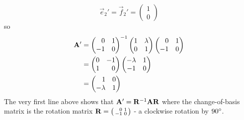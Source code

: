 \documentclass[fleqn,a4paper,11pt]{article}
\begin{document}
\begin{enumerate}[label=\textbf{\arabic*.}]
\begin{enumerate}[label=(\alph*)]
\begin{equation*}
     \vec e_2' = \vec f_2' = \begin{pmatrix} 1 \\ 0 \end{pmatrix}
    \end{equation*}
    so
    \begin{align*}
     \mat A'
     &=
     \begin{pmatrix*}[r]
      0 & 1 \\
      -1 & 0
     \end{pmatrix*}^{-1}
     \begin{pmatrix}
      1 & \lambda \\
      0 & 1
     \end{pmatrix}
     \begin{pmatrix*}[r]
      0 & 1 \\
      -1 & 0
     \end{pmatrix*} \\
     &=
     \begin{pmatrix*}[r]
      0 & -1 \\
      1 & 0
     \end{pmatrix*}
     \begin{pmatrix}
      -\lambda & 1 \\
      -1 & 0
     \end{pmatrix} \\
     &=
     \begin{pmatrix*}[r]
      1 & 0 \\
      -\lambda & 1
     \end{pmatrix*}
    \end{align*}
    The very first line above shows that
    \(\mathbf{A}' = \mathbf{R}^{-1} \mathbf{A} \mathbf{R}\) where
    the change-of-basis matrix is the rotation matrix
    \(\mat R = \begin{psmallmatrix*}[r] 0 & 1 \\ -1 & 0 \end{psmallmatrix*}\) -
    a clockwise rotation by \(90^\circ\).


\end{enumerate}
\end{enumerate}
\end{document}
